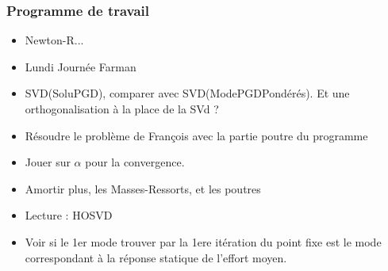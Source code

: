 \documentclass[12pt]{beamer}
\begin{document}
	\begin{frame}
	
		\frametitle{Programme de travail}
		
		\begin{itemize}
			\item Newton-R...
			\item Lundi Journée Farman
			\item SVD(SoluPGD), comparer avec SVD(ModePGDPondérés). Et une orthogonalisation à la place de la SVd ?
			\item Résoudre le problème de François avec la partie poutre du programme
			\item Jouer sur $\alpha$ pour la convergence.
			\item Amortir plus, les Masses-Ressorts, et les poutres
			\item Lecture : HOSVD
			\item Voir si le 1er mode trouver par la 1ere itération du point fixe est le mode correspondant à la réponse statique de l'effort moyen.
		\end{itemize}
	
	\end{frame}
%
%
%
%	
%	
%	
%
\end{document}
